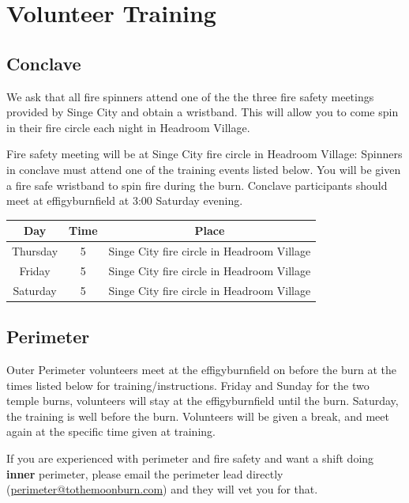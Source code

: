 \clearpage
\section*{Volunteer Training}

\subsection*{Conclave}
We ask that all fire spinners attend one of the the three fire safety meetings provided by Singe City and obtain a wristband. This will allow you to come spin in their fire circle each night in Headroom Village. 

Fire safety meeting will be at Singe City fire circle in Headroom Village:
Spinners in conclave must attend one of the training events listed below.
You will be given a fire safe wristband to spin fire during the burn. Conclave participants should meet at \gls{effigyburnfield} at 3:00\pm{} Saturday evening.

\begin{center}
\begin{tabular}{|c|c|c|}
\hline
\textbf{Day} & \textbf{Time} & \textbf{Place} \\ \hline
Thursday & 5\pm{} & Singe City fire circle in Headroom Village \\ \hline
Friday & 5\pm{} & Singe City fire circle in Headroom Village  \\ \hline
Saturday & 5\pm{} & Singe City fire circle in Headroom Village  \\ \hline
\end{tabular}
\end{center}


\subsection*{Perimeter}
Outer Perimeter volunteers meet at the \gls{effigyburnfield} on before the burn at the times listed below for training/instructions. Friday and Sunday for the two temple burns, volunteers will stay at the \gls{effigyburnfield} until the burn. Saturday, the training is well before the burn. Volunteers will be given a break, and meet again at the specific time given at training.

If you are experienced with perimeter and fire safety and want a shift doing \textbf{inner} perimeter, please email the perimeter lead directly (\url{perimeter@tothemoonburn.com}) and they will vet you for that.

